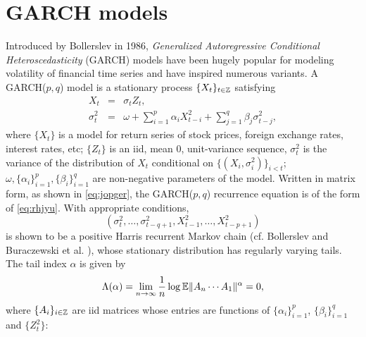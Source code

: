 
\section{GARCH models}
\label{sec:garch:intro}
Introduced by Bollerslev \cite{bollerslev:1986} in 1986,
{\em Generalized Autoregressive Conditional Heteroscedasticity}
(GARCH) models have been hugely popular for modeling volatility of
financial time series and have inspired numerous variants.
A GARCH($p, q$) model is a stationary process
$\{X_t\}_{t \in \mathbb Z}$ satisfying
\begin{eqnarray}
  \label{eq:garch:intro}
  X_t &=& \sigma_t Z_t, \\
  \sigma_t^2 &=& \omega + \sum_{i=1}^p \alpha_i X_{t-i}^2 +
  \sum_{j=1}^q \beta_j \sigma_{t-j}^2,
\end{eqnarray}
where $\{X_t\}$ is a model for return series of stock prices,
foreign exchange rates, interest rates, etc; $\{Z_t\}$ is an iid,
mean 0, unit-variance sequence, $\sigma_t^2$ is the variance of the
distribution of $X_t$ conditional on
$\{(X_i, \sigma_i^2)\}_{i < t}$; $\omega, \{\alpha_i\}_{i=1}^p,
\{\beta_i\}_{i=1}^q$ are non-negative parameters of the model.
Written in matrix form, as shown in \eqref{eq:jopger}, the
GARCH($p,q$) recurrence  equation is of the form of
\eqref{eq:rhjyu}. With appropriate conditions,
\[
(\sigma_t^2, \dots, \sigma_{t-q+1}^2, X_{t-1}^2, \dots, X_{t - p +1}^2)
\]
is shown to be a positive Harris recurrent Markov chain
(cf. Bollerslev \cite{bollerslev:1986} and Buraczewski et al.
\cite{buraczewski:damek:mikosch:2016}), whose stationary distribution
has regularly varying tails. The tail index $\alpha$ is given by
\begin{equation}
  \label{eq:grgbg}
  \Lambda(\alpha) = \lim_{n \to \infty} {1 \over n}\log\mathbb{E}\|A_n \cdots A_1\|^\alpha = 0,
\end{equation}
where $\{A_i\}_{i \in \mathbb Z}$ are iid matrices whose entries are
functions of $\{\alpha_i\}_{i=1}^p$, $\{\beta_i\}_{i=1}^q$ and
$\{Z_t^2\}$:
